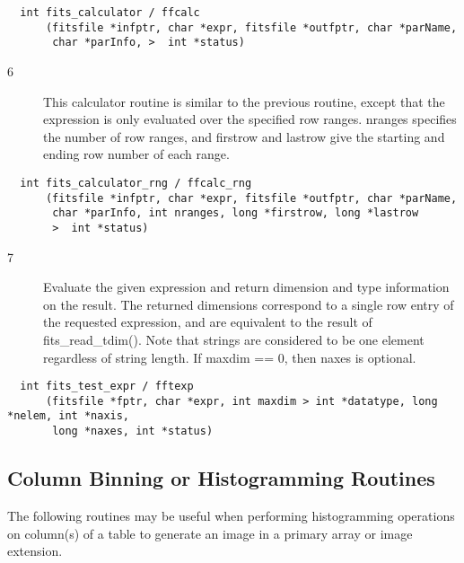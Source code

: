 \documentclass[11pt]{book}
\begin{document}
\begin{verbatim}
  int fits_calculator / ffcalc
      (fitsfile *infptr, char *expr, fitsfile *outfptr, char *parName,
       char *parInfo, >  int *status)
\end{verbatim}

\begin{description}
\item[6 ] This calculator routine is similar to the previous routine, except
that the expression is only evaluated over the specified
row ranges.  nranges specifies the number of row ranges, and firstrow
and lastrow give the starting and ending row number of each range. \label{ffcalcrng}
\end{description}

\begin{verbatim}
  int fits_calculator_rng / ffcalc_rng
      (fitsfile *infptr, char *expr, fitsfile *outfptr, char *parName,
       char *parInfo, int nranges, long *firstrow, long *lastrow
       >  int *status)
\end{verbatim}

\begin{description}
\item[7 ]Evaluate the given expression and return dimension and type information
on the result.  The returned dimensions correspond to a single row entry
of the requested expression, and are equivalent to the result of fits\_read\_tdim().
Note that strings are considered to be one element regardless of string length.
If maxdim == 0, then naxes is optional. \label{fftexp}
\end{description}

\begin{verbatim}
  int fits_test_expr / fftexp
      (fitsfile *fptr, char *expr, int maxdim > int *datatype, long *nelem, int *naxis,
       long *naxes, int *status)
\end{verbatim}


\subsection{Column Binning or Histogramming Routines}

The following routines may be useful when performing histogramming operations on
column(s) of a table to generate an image in a primary array or image extension.
\end{document}
